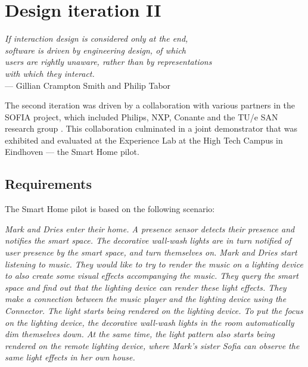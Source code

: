 \chapter{Design iteration II}

\begin{flushright}{\slshape    
If interaction design is considered only at the end, \\
software is driven by engineering design, of which \\
users are rightly unaware, rather than by representations \\
with which they interact.} \\ \medskip
    --- Gillian Crampton Smith and Philip Tabor \cite{Winograd1996}
\end{flushright}


The second iteration was driven by a collaboration with various partners in the \ac{SOFIA} project, which included Philips, NXP, Conante and the TU/e \ac{SAN} research group . This collaboration culminated in a joint demonstrator that was exhibited and evaluated at the Experience Lab at the High Tech Campus in Eindhoven --- the Smart Home pilot.

\section{Requirements}


The Smart Home pilot is based on the following scenario:

\textit{Mark and Dries enter their home. A presence sensor detects their presence and notifies the smart space. The decorative wall-wash lights are in turn notified of user presence by the smart space, and turn themselves on. Mark and Dries start listening to music. They would like to try to render the music on a lighting device to also create some visual effects accompanying the music. They query the smart space and find out that the lighting device can render these light effects. They make a connection between the music player and the lighting device using the Connector. The light starts being rendered on the lighting device. To put the focus on the lighting device, the decorative wall-wash lights in the room automatically dim themselves down. At the same time, the light pattern also starts being rendered on the remote lighting device, where Mark's sister Sofia can observe the same light effects in her own house.}


